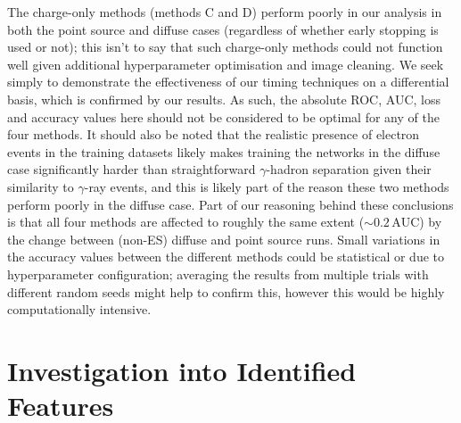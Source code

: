 The charge-only methods \cite{Shilon} (methods C and D) perform poorly in our analysis in both the point source and diffuse cases (regardless of whether early stopping is used or not); this isn't to say that such charge-only methods could not function well given additional hyperparameter optimisation and image cleaning. We seek simply to demonstrate the effectiveness of our timing techniques on a differential basis, which is confirmed by our results. As such, the absolute ROC, AUC, loss and accuracy values here should not be considered to be optimal for any of the four methods. It should also be noted that the realistic presence of electron events in the training datasets likely makes training the networks in the diffuse case significantly harder than straightforward $\gamma$-hadron separation given their similarity to $\gamma$-ray events, and this is likely part of the reason these two methods perform poorly in the diffuse case. Part of our reasoning behind these conclusions is that all four methods are affected to roughly the same extent ($\mathrm{\sim0.2\,AUC}$) by the change between (non-ES) diffuse and point source runs. Small variations in the accuracy values between the different methods could be statistical or due to hyperparameter configuration; averaging the results from multiple trials with different random seeds might help to confirm this, however this would be highly computationally intensive.

\section{Investigation into Identified Features} \label{Learned}

